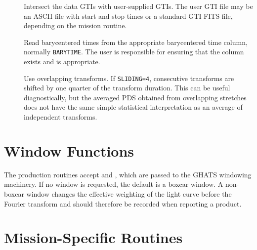 \begin{description}
\item[] Intersect the data GTIs with user-supplied GTIs.  The
  user GTI file may be an ASCII file with start and stop times or a standard
  GTI FITS file, depending on the mission routine.
\item[] Read barycentered times from the appropriate
  barycentered time column, normally \texttt{BARYTIME}.  The user is
  responsible for ensuring that the column exists and is appropriate.
\item[] Use overlapping transforms.  If
  \texttt{SLIDING=4}, consecutive transforms are shifted by one quarter of
  the transform duration.  This can be useful diagnostically, but the averaged
  PDS obtained from overlapping stretches does not have the same simple
  statistical interpretation as an average of independent transforms.
\end{description}

\section{Window Functions}

The production routines accept  and , which are
passed to the GHATS windowing machinery.  If no window is requested, the
default is a boxcar window.  A non-boxcar window changes the effective
weighting of the light curve before the Fourier transform and should therefore
be recorded when reporting a product.

\section{Mission-Specific Routines}


